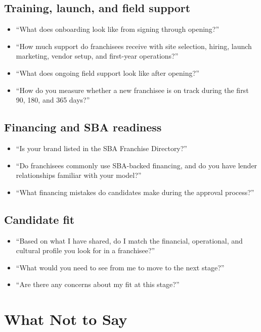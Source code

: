 \documentclass[11pt]{article}
\begin{document}
\subsection{Training, launch, and field support}

\begin{itemize}
  \item ``What does onboarding look like from signing through opening?''
  \item ``How much support do franchisees receive with site selection, hiring, launch marketing, vendor setup, and first-year operations?''
  \item ``What does ongoing field support look like after opening?''
  \item ``How do you measure whether a new franchisee is on track during the first 90, 180, and 365 days?''
\end{itemize}

\subsection{Financing and SBA readiness}

\begin{itemize}
  \item ``Is your brand listed in the SBA Franchise Directory?''
  \item ``Do franchisees commonly use SBA-backed financing, and do you have lender relationships familiar with your model?''
  \item ``What financing mistakes do candidates make during the approval process?''
\end{itemize}

\subsection{Candidate fit}

\begin{itemize}
  \item ``Based on what I have shared, do I match the financial, operational, and cultural profile you look for in a franchisee?''
  \item ``What would you need to see from me to move to the next stage?''
  \item ``Are there any concerns about my fit at this stage?''
\end{itemize}

\section{What Not to Say}
\end{document}
